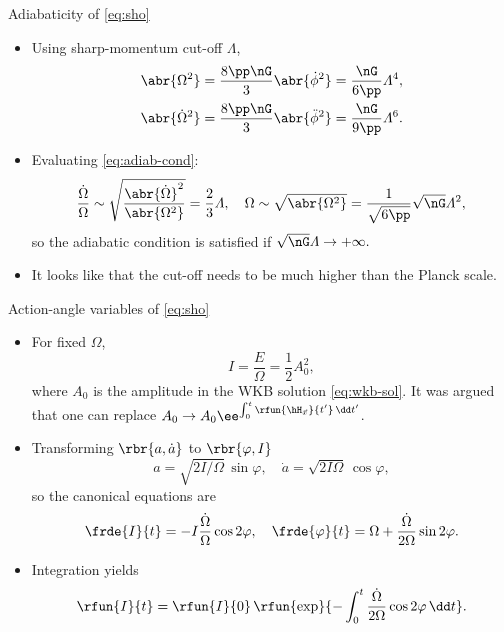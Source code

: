 \documentclass{beamer}
\begin{document}
\begin{frame}{Adiabaticity of \cref{eq:sho}}
\begin{itemize}
\item Using sharp-momentum cut-off $\varLambda$,
\begin{align}
\abr{\Omega^2} &= \frac{8\pp\nG}{3} \abr{{\dot{\phi}}^2} =
\frac{\nG}{6\pp} \varLambda^4,\\
\abr{{\dot\Omega}^2} &= \frac{8\pp\nG}{3} 
\abr{{\ddot{\phi}}^2} = \frac{\nG}{9\pp} \varLambda^6.
\end{align}
\item Evaluating \cref{eq:adiab-cond}:
\begin{equation}
\frac{\dot\Omega}{\Omega} \sim
\sqrt{\frac{\abr{\dot\Omega}^2}{\abr{\Omega^2}}} = \frac{2}{3} 
\varLambda,\quad \Omega \sim \sqrt{\abr{\Omega^2}} = \frac{1}{\sqrt{6\pp}}
\sqrt{\nG}\varLambda^2,
\end{equation}
so the adiabatic condition is satisfied if $\sqrt{\nG}\varLambda \to +\infty.$
\item It looks like that the cut-off needs to be much higher than the Planck 
scale.


\end{itemize}

\end{frame}

\begin{frame}{Action-angle variables of \cref{eq:sho}}
\begin{itemize}
\item For fixed $\Omega$,
\begin{equation}
I = \frac{E}{\Omega} = \frac{1}{2} A_0^2,
\label{eq:I-amp}
\end{equation}
where $A_0$ is the amplitude in the WKB solution \cref{eq:wkb-sol}. It was 
argued that one can replace $A_0 \to A_0 \ee^{\int_0^t \rfun{\hH_{\vec 
x}}{t'}\,\dd t'}$.

\item Transforming $\rbr{a, \dot a}$ to $\rbr{\varphi, I}$
\begin{equation}
a = \sqrt{2I/\Omega}\,\sin\varphi,\quad
\dot a = \sqrt{2I\Omega}\,\cos\varphi,
\label{eq:trsf-aadot}
\end{equation}
so the canonical equations are
\begin{equation}
\frde{I}{t} = -I \frac{\dot \Omega}{\Omega} \cos2\varphi,\quad
\frde{\varphi}{t} = \Omega + \frac{\dot \Omega}{2\Omega}\sin2\varphi.
\end{equation}
\item Integration yields
\begin{equation}
\rfun{I}{t} = \rfun{I}{0}\,\rfun{\exp}{-\int_0^t\frac{\dot\Omega}{2\Omega} 
\cos2\varphi\,\dd t}.
\label{eq:int_I}
\end{equation}


\end{itemize}

\end{frame}
\end{document}
